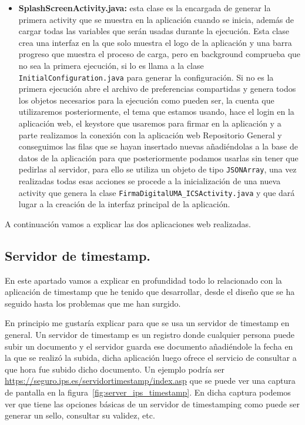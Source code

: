 \begin{itemize}
\item \textbf{SplashScreenActivity.java:} esta clase es la encargada de generar la primera activity que se muestra en la aplicación cuando se inicia, además de cargar todas las variables que serán usadas durante la ejecución. Esta clase crea una interfaz en la que solo muestra el logo de la aplicación y una barra progreso que muestra el proceso de carga, pero en background comprueba que no sea la primera ejecución, si lo es llama a la clase \lstinline{InitialConfiguration.java} para generar la configuración. Si no es la primera ejecución abre el archivo de preferencias compartidas y genera todos los objetos necesarios para la ejecución como pueden ser, la cuenta que utilizaremos posteriormente, el tema que estamos usando, hace el login en la aplicación web, el keystore que usaremos para firmar en la aplicación y a parte realizamos la conexión con la aplicación web Repositorio General y conseguimos las filas que se hayan insertado nuevas añadiéndolas a la base de datos de la aplicación para que posteriormente podamos usarlas sin tener que pedirlas al servidor, para ello se utiliza un objeto de tipo \lstinline{JSONArray}, una vez realizadas todas esas acciones se procede a la inicialización de una nueva activity que genera la clase \lstinline{FirmaDigitalUMA_ICSActivity.java} y que dará lugar a la creación de la interfaz principal de la aplicación.

\end{itemize}

A continuación vamos a explicar las dos aplicaciones web realizadas.

\subsection{Servidor de timestamp.}

En este apartado vamos a explicar en profundidad todo lo relacionado con la aplicación de timestamp que he tenido que desarrollar, desde el diseño que se ha seguido hasta los problemas que me han surgido.

En principio me gustaría explicar para que se usa un servidor de timestamp en general. Un servidor de timestamp es un registro donde cualquier persona puede subir un documento y el servidor guarda ese documento añadiéndole la fecha en la que se realizó la subida, dicha aplicación luego ofrece el servicio de consultar a que hora fue subido dicho documento. Un ejemplo podría ser \url{https://seguro.ips.es/servidortimestamp/index.asp} que se puede ver una captura de pantalla en la figura~\ref{fig:server_ips_timestamp}. En dicha captura podemos ver que tiene las opciones básicas de un servidor de timestamping como puede ser generar un sello, consultar su validez, etc. 

